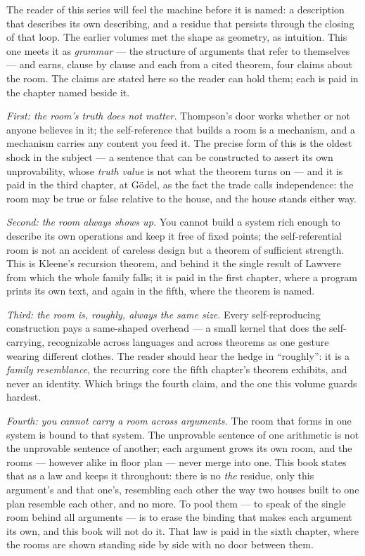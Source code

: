 The reader of this series will feel the machine before it is named: a
description that describes its own describing, and a residue that persists
through the closing of that loop. The earlier volumes met the shape as
geometry, as intuition. This one meets it as \emph{grammar} --- the
structure of arguments that refer to themselves --- and earns, clause by
clause and each from a cited theorem, four claims about the room. The
claims are stated here so the reader can hold them; each is paid in the
chapter named beside it.

\emph{First: the room's truth does not matter.} Thompson's door works
whether or not anyone believes in it; the self-reference that builds a
room is a mechanism, and a mechanism carries any content you feed it. The
precise form of this is the oldest shock in the subject --- a sentence
that can be constructed to assert its own unprovability, whose \emph{truth
value} is not what the theorem turns on --- and it is paid in the third
chapter, at G\"odel, as the fact the trade calls independence: the room
may be true or false relative to the house, and the house stands either
way.

\emph{Second: the room always shows up.} You cannot build a system rich
enough to describe its own operations and keep it free of fixed points;
the self-referential room is not an accident of careless design but a
theorem of sufficient strength. This is Kleene's recursion theorem, and
behind it the single result of Lawvere from which the whole family falls;
it is paid in the first chapter, where a program prints its own text, and
again in the fifth, where the theorem is named.

\emph{Third: the room is, roughly, always the same size.} Every
self-reproducing construction pays a same-shaped overhead --- a small
kernel that does the self-carrying, recognizable across languages and
across theorems as one gesture wearing different clothes. The reader
should hear the hedge in ``roughly'': it is a \emph{family resemblance},
the recurring core the fifth chapter's theorem exhibits, and never an
identity. Which brings the fourth claim, and the one this volume guards
hardest.

\emph{Fourth: you cannot carry a room across arguments.} The room that
forms in one system is bound to that system. The unprovable sentence of
one arithmetic is not the unprovable sentence of another; each argument
grows its own room, and the rooms --- however alike in floor plan ---
never merge into one. This book states that as a law and keeps it
throughout: there is no \emph{the} residue, only this argument's and that
one's, resembling each other the way two houses built to one plan
resemble each other, and no more. To pool them --- to speak of the single
room behind all arguments --- is to erase the binding that makes each
argument its own, and this book will not do it. That law is paid in the
sixth chapter, where the rooms are shown standing side by side with no
door between them.

